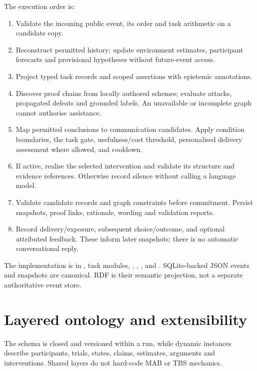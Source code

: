 \documentclass[11pt,a4paper]{article}
\begin{document}
The execution order is:
\begin{enumerate}
\item Validate the incoming public event, its order and task arithmetic on a candidate copy.
\item Reconstruct permitted history; update environment estimates, participant forecasts and provisional hypotheses without future-event access.
\item Project typed task records and scoped assertions with epistemic annotations.
\item Discover proof chains from locally authored schemes; evaluate attacks, propagated defeats and grounded labels. An unavailable or incomplete graph cannot authorise assistance.
\item Map permitted conclusions to communication candidates. Apply condition boundaries, the task gate, usefulness/cost threshold, personalised delivery assessment where allowed, and cooldown.
\item If active, realise the selected intervention and validate its structure and evidence references. Otherwise record silence without calling a language model.
\item Validate candidate records and graph constraints before commitment. Persist snapshots, proof links, rationale, wording and validation reports.
\item Record delivery/exposure, subsequent choice/outcome, and optional attributed feedback. These inform later snapshots; there is no automatic conversational reply.
\end{enumerate}
The implementation is in , task modules, , , ,  and . SQLite-backed JSON events and snapshots are canonical. RDF is their semantic projection, not a separate authoritative event store.

\section{Layered ontology and extensibility}
The schema is closed and versioned within a run, while dynamic instances describe participants, trials, states, claims, estimates, arguments and interventions. Shared layers do not hard-code MAB or TBS mechanics.
\end{document}
